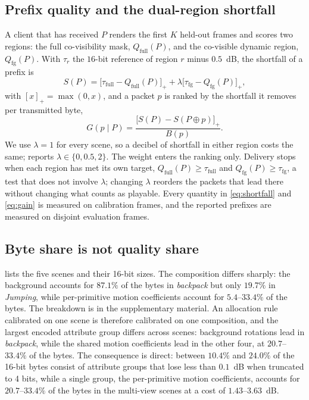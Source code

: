 \documentclass[lettersize,journal]{IEEEtran}
\begin{document}
\subsection{Prefix quality and the dual-region shortfall}
\label{sec:utility}
A client that has received $P$ renders the first $K$ held-out frames and scores
two regions: the full co-visibility mask, $Q_{\text{full}}(P)$, and the
co-visible dynamic region, $Q_{\text{fg}}(P)$. With $\tau_{r}$ the $16$-bit
reference of region $r$ minus $0.5$~dB, the shortfall of a prefix is
\begin{equation}
\label{eq:shortfall}
S(P)=\bigl[\tau_{\text{full}}-Q_{\text{full}}(P)\bigr]_{+}
+\lambda\bigl[\tau_{\text{fg}}-Q_{\text{fg}}(P)\bigr]_{+},
\end{equation}
with $[x]_{+}=\max(0,x)$,
and a packet $p$ is ranked by the shortfall it removes per transmitted byte,
\begin{equation}
\label{eq:gain}
G(p\mid P)=\frac{\bigl[S(P)-S(P\oplus p)\bigr]_{+}}{B(p)} .
\end{equation}
We use $\lambda=1$ for every scene, so a decibel of shortfall in either region
costs the same;  reports $\lambda\in\{0,0.5,2\}$. The weight
enters the ranking only. Delivery stops when each region has met its own target,
$Q_{\text{full}}(P)\ge\tau_{\text{full}}$ and
$Q_{\text{fg}}(P)\ge\tau_{\text{fg}}$, a test that does not involve $\lambda$;
changing $\lambda$ reorders the packets that lead there without changing what
counts as playable. Every quantity in \eqref{eq:shortfall} and \eqref{eq:gain}
is measured on calibration frames, and the reported prefixes are measured on
disjoint evaluation frames.

\subsection{Byte share is not quality share}
\label{sec:share}
 lists the five scenes and their 16-bit sizes. The composition
differs sharply: the background accounts for $87.1\%$ of the bytes in
\emph{backpack} but only $19.7\%$ in \emph{Jumping}, while per-primitive motion
coefficients account for $5.4$--$33.4\%$ of the bytes. The breakdown is in the supplementary material. An allocation rule calibrated on one scene is therefore calibrated on one
composition, and the largest encoded attribute group differs across scenes:
background rotations lead in \emph{backpack}, while the shared motion
coefficients lead in the other four, at $20.7$--$33.4\%$ of the bytes. The consequence is direct: between
$10.4\%$ and $24.0\%$ of the 16-bit bytes consist of attribute groups that lose
less than $0.1$~dB when truncated to 4 bits, while a single group, the
per-primitive motion coefficients, accounts for $20.7$--$33.4\%$ of the bytes in
the multi-view scenes at a cost of $1.43$--$3.63$~dB.
\end{document}
